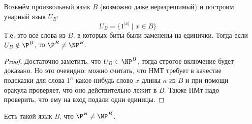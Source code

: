 	\begin{lemma}
		Возьмём произвольный язык $B$ (возможно даже неразрешимый) и построим унарный язык $U_B$:
		\[ U_B = \{ 1^{|x|} \mid x \in B \} \]
		Т.е. это все слова из $B$, в которых биты были заменены на единички.
		Тогда если $U_B \notin \P^B$, то $\P^B \neq \NP^B$.
	\end{lemma}
	\begin{proof}
		Достаточно заметить, что $U_B \in \NP^B$, тогда строгое включение будет доказано.
		Но это очевидно: можно считать, что НМТ требует в качестве подсказки для слова $1^n$ какое-нибудь слово $x$ длины $n$
		из $B$ и при помощи оракула проверяет, что оно действительно лежит в $B$.
		Также НМт надо проверить, что ему на вход подали одни единицы.
	\end{proof}

	\begin{theorem}
		Есть такой язык $B$, что $\P^B \neq \NP^B$.
	\end{theorem}
